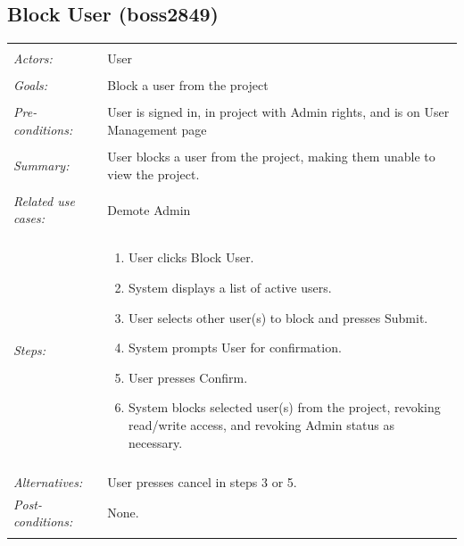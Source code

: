 \documentclass[11pt]{report}
\begin{document}
\subsection{Block User (boss2849)}
\begin{tabular}{ p{2cm} p{12cm} }
 \hline
 \\
 \textit{Actors:} & User \\ 
 \\
 \textit{Goals:} & Block a user from the project \\
 \\
 \textit{Pre-conditions:} & User is signed in, in project with Admin rights, and is on User Management page \\
 \\
 \textit{Summary:} & User blocks a user from the project, making them unable to view the project. \\ 
 \\
 \textit{Related use cases:} & Demote Admin \\ 
 \\
 \textit{Steps:} & \begin{enumerate}
  \item User clicks Block User.
  \item System displays a list of active users.
  \item User selects other user(s) to block and presses Submit.
  \item System prompts User for confirmation.
  \item User presses Confirm.
  \item System blocks selected user(s) from the project, revoking read/write access, and revoking Admin status as necessary.
 \end{enumerate} \\
 \\
 \textit{Alternatives:} & User presses cancel in steps 3 or 5.
 \\
 \textit{Post-conditions:} & None. \\
 \\
\hline
\end{tabular}
\end{document}

